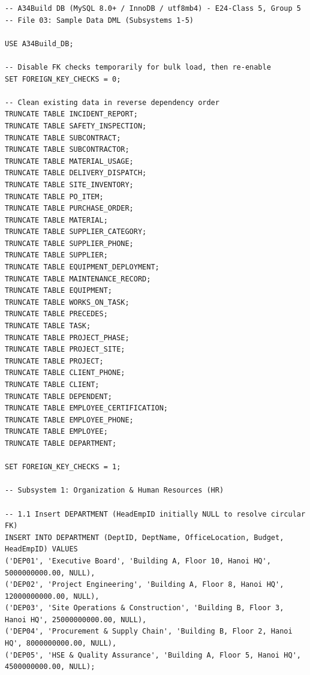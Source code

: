 \documentclass[a4paper,12pt]{report}
\begin{document}
\begin{lstlisting}
-- A34Build DB (MySQL 8.0+ / InnoDB / utf8mb4) - E24-Class 5, Group 5
-- File 03: Sample Data DML (Subsystems 1-5)

USE A34Build_DB;

-- Disable FK checks temporarily for bulk load, then re-enable
SET FOREIGN_KEY_CHECKS = 0;

-- Clean existing data in reverse dependency order
TRUNCATE TABLE INCIDENT_REPORT;
TRUNCATE TABLE SAFETY_INSPECTION;
TRUNCATE TABLE SUBCONTRACT;
TRUNCATE TABLE SUBCONTRACTOR;
TRUNCATE TABLE MATERIAL_USAGE;
TRUNCATE TABLE DELIVERY_DISPATCH;
TRUNCATE TABLE SITE_INVENTORY;
TRUNCATE TABLE PO_ITEM;
TRUNCATE TABLE PURCHASE_ORDER;
TRUNCATE TABLE MATERIAL;
TRUNCATE TABLE SUPPLIER_CATEGORY;
TRUNCATE TABLE SUPPLIER_PHONE;
TRUNCATE TABLE SUPPLIER;
TRUNCATE TABLE EQUIPMENT_DEPLOYMENT;
TRUNCATE TABLE MAINTENANCE_RECORD;
TRUNCATE TABLE EQUIPMENT;
TRUNCATE TABLE WORKS_ON_TASK;
TRUNCATE TABLE PRECEDES;
TRUNCATE TABLE TASK;
TRUNCATE TABLE PROJECT_PHASE;
TRUNCATE TABLE PROJECT_SITE;
TRUNCATE TABLE PROJECT;
TRUNCATE TABLE CLIENT_PHONE;
TRUNCATE TABLE CLIENT;
TRUNCATE TABLE DEPENDENT;
TRUNCATE TABLE EMPLOYEE_CERTIFICATION;
TRUNCATE TABLE EMPLOYEE_PHONE;
TRUNCATE TABLE EMPLOYEE;
TRUNCATE TABLE DEPARTMENT;

SET FOREIGN_KEY_CHECKS = 1;

-- Subsystem 1: Organization & Human Resources (HR)

-- 1.1 Insert DEPARTMENT (HeadEmpID initially NULL to resolve circular FK)
INSERT INTO DEPARTMENT (DeptID, DeptName, OfficeLocation, Budget, HeadEmpID) VALUES
('DEP01', 'Executive Board', 'Building A, Floor 10, Hanoi HQ', 5000000000.00, NULL),
('DEP02', 'Project Engineering', 'Building A, Floor 8, Hanoi HQ', 12000000000.00, NULL),
('DEP03', 'Site Operations & Construction', 'Building B, Floor 3, Hanoi HQ', 25000000000.00, NULL),
('DEP04', 'Procurement & Supply Chain', 'Building B, Floor 2, Hanoi HQ', 8000000000.00, NULL),
('DEP05', 'HSE & Quality Assurance', 'Building A, Floor 5, Hanoi HQ', 4500000000.00, NULL);


\end{lstlisting}
\end{document}
